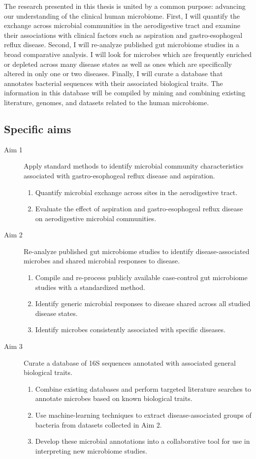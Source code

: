 \documentclass[12pt]{article}
\begin{document}
The research presented in this thesis is united by a common purpose: 
advancing our understanding of the clinical human microbiome.
First, I will quantify the exchange across microbial communities
in the aerodigestive tract and examine their associations with clinical factors
such as aspiration and gastro-esophogeal reflux disease.
Second, I will re-analyze published gut microbiome studies in a 
broad comparative analysis. 
I will look for microbes which are frequently enriched or depleted
across many disease states as well as ones which are specifically 
altered in only one or two diseases. 
Finally, I will curate a database that annotates bacterial sequences 
with their associated biological traits. The information in this database will
be compiled by mining and combining existing literature, genomes, and datasets
related to the human microbiome.

\subsection{Specific aims}
\begin{description}
	\item[Aim 1] Apply standard methods to identify microbial 
	community characteristics associated with gastro-esophogeal reflux 
	disease and aspiration.
	\begin{enumerate}
		\item Quantify microbial exchange across sites in the aerodigestive 
		tract.
		\item Evaluate the effect of aspiration and gastro-esophogeal 
		reflux disease on aerodigestive microbial communities.
	\end{enumerate}
	\item[Aim 2] Re-analyze published gut 
	microbiome studies to identify disease-associated microbes and shared
	microbial responses to disease.
	\begin{enumerate}
		\item Compile and re-process publicly available case-control gut 
		microbiome studies with a standardized method.
		\item Identify generic microbial responses to disease shared across all studied disease states.
		\item Identify microbes consistently associated with specific diseases.
	\end{enumerate}
	\item[Aim 3] Curate a database of 16S sequences annotated with 
	associated general biological traits.
	\begin{enumerate}
		\item Combine existing databases and perform targeted literature searches 
		to annotate microbes based on known biological 
		traits.
		\item Use machine-learning techniques to extract disease-associated 
		groups of bacteria from datasets collected in Aim 2.
		\item Develop these microbial annotations into a collaborative 
		tool for use in interpreting new microbiome studies.
	\end{enumerate}
\end{description}
\newpage
\end{document}
